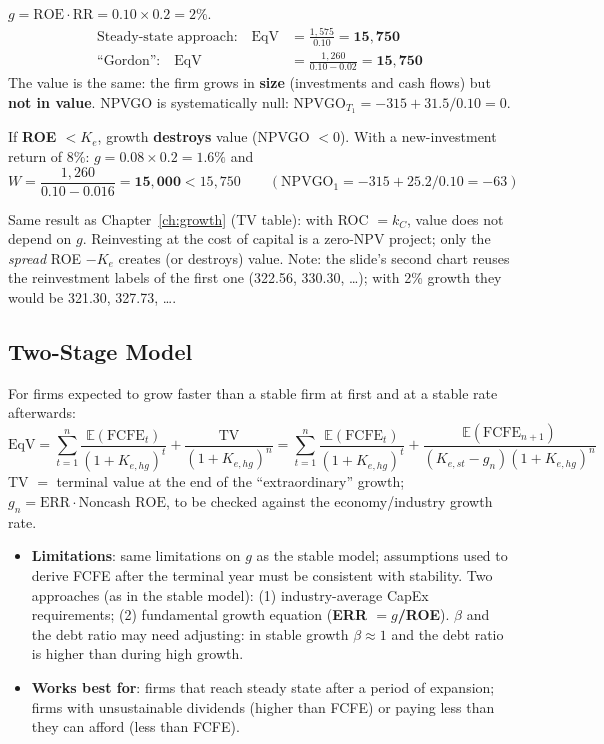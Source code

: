 \begin{exbox}[What if (noncash) ROE $=K_e=10\%$? And ROE $<K_e$?]
$g=\text{ROE}\cdot\text{RR}=0.10\times0.2=2\%$.
\begin{align*}
\text{Steady-state approach:}\quad\text{EqV}&=\frac{1{,}575}{0.10}=\mathbf{15{,}750}\\
\text{``Gordon'':}\quad\text{EqV}&=\frac{1{,}260}{0.10-0.02}=\mathbf{15{,}750}
\end{align*}
The value is the same: the firm grows in \textbf{size} (investments and cash flows) but \textbf{not in value}. NPVGO is systematically null: $\text{NPVGO}_{T_1}=-315+31.5/0.10=0$.

\medskip
If \textbf{ROE $<K_e$}, growth \textbf{destroys} value (NPVGO $<0$). With a new-investment return of 8\%: $g=0.08\times0.2=1.6\%$ and
\[
W=\frac{1{,}260}{0.10-0.016}=\mathbf{15{,}000}<15{,}750\qquad(\text{NPVGO}_1=-315+25.2/0.10=-63)
\]
\end{exbox}
\begin{addbox}
Same result as Chapter~\ref{ch:growth} (TV table): with ROC $=k_C$, value does not depend on $g$. Reinvesting at the cost of capital is a zero-NPV project; only the \emph{spread} ROE $-K_e$ creates (or destroys) value. Note: the slide's second chart reuses the reinvestment labels of the first one (322.56, 330.30, \dots); with 2\% growth they would be 321.30, 327.73, \dots.
\end{addbox}

\subsection{Two-Stage Model}
\begin{keybox}
For firms expected to grow faster than a stable firm at first and at a stable rate afterwards:
\[
\text{EqV}=\sum_{t=1}^{n}\frac{\mathbb{E}(\text{FCFE}_t)}{(1+K_{e,hg})^t}+\frac{\text{TV}}{(1+K_{e,hg})^n}=\sum_{t=1}^{n}\frac{\mathbb{E}(\text{FCFE}_t)}{(1+K_{e,hg})^t}+\frac{\mathbb{E}(\text{FCFE}_{n+1})}{(K_{e,st}-g_n)(1+K_{e,hg})^n}
\]
TV $=$ terminal value at the end of the ``extraordinary'' growth; $g_n=\text{ERR}\cdot\text{Noncash ROE}$, to be checked against the economy/industry growth rate.
\end{keybox}
\begin{itemize}
  \item \textbf{Limitations}: same limitations on $g$ as the stable model; assumptions used to derive FCFE after the terminal year must be consistent with stability. Two approaches (as in the stable model): (1) industry-average CapEx requirements; (2) fundamental growth equation (\textbf{ERR $=g$/ROE}). $\beta$ and the debt ratio may need adjusting: in stable growth $\beta\approx1$ and the debt ratio is higher than during high growth.
  \item \textbf{Works best for}: firms that reach steady state after a period of expansion; firms with unsustainable dividends (higher than FCFE) or paying less than they can afford (less than FCFE).
\end{itemize}

